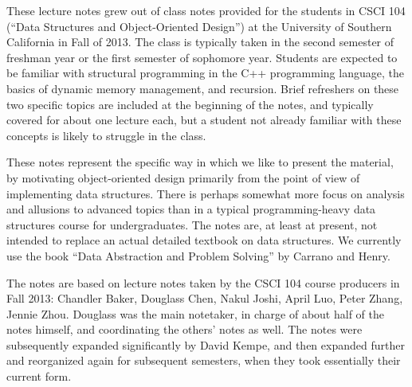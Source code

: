 These lecture notes grew out of class notes provided for the students
in CSCI 104 (``Data Structures and Object-Oriented Design'') 
at the University of Southern California in Fall of 2013.
The class is typically taken in the second semester of freshman year
or the first semester of sophomore year. Students are expected to be
familiar with structural programming in the C++ programming language,
the basics of dynamic memory management, and recursion.
Brief refreshers on these two specific topics are included at the
beginning of the notes, and typically covered for about one lecture
each, but a student not already familiar with these concepts is likely
to struggle in the class.

These notes represent the specific way in which we like to present the
material, by motivating object-oriented design primarily from the
point of view of implementing data structures. There is perhaps
somewhat more focus on analysis and allusions to advanced topics than
in a typical programming-heavy data structures course for undergraduates.
The notes are, at least at present, not intended to replace an actual
detailed textbook on data structures. 
We currently use the book ``Data Abstraction and Problem Solving'' by
Carrano and Henry.

The notes are based on lecture notes taken by the CSCI 104 course
producers in Fall 2013:
Chandler Baker, Douglass Chen, Nakul Joshi, April Luo, Peter Zhang,
Jennie Zhou.
Douglass was the main notetaker, in charge of about half of the notes
himself, and coordinating the others' notes as well.
The notes were subsequently expanded significantly by David Kempe,
and then expanded further and reorganized again for subsequent semesters,
when they took essentially their current form.
